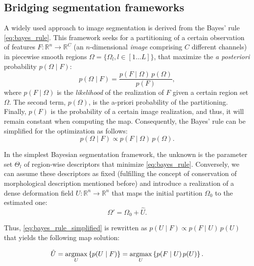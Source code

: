 \subsection{Bridging segmentation frameworks}
\label{sec:methods_map}
%
A widely used approach to image segmentation is derived from the
Bayes' rule \eqref{eq:bayes_rule}. This framework seeks for a 
partitioning of a certain observation of features $F: \mathbb{R}^n \to %
\mathbb{R}^C$ (an $n$-dimensional \emph{image} comprising $C$ different 
channels) in piecewise smooth regions $\Omega = \lbrace \Omega_l , 
l\in\left[ 1 \ldots L \right] \rbrace$,  that maximize the \emph{a posteriori}
probability $p(\Omega \mid F)$:
\begin{equation}
p(\Omega \mid F) = \frac{p(F \mid \Omega)\, p(\Omega)}{p(F)},
\label{eq:bayes_rule}
\end{equation}
where $p(F \mid \Omega)$ is the \emph{likelihood} of the realization 
of $F$ given a certain region set $\Omega$. The second term, $p(\Omega)$,
is the a-priori probability of the partitioning. Finally, $p(F)$ is the 
probability of a certain image realization, and thus, it will remain 
constant when computing the \gls{map}. Consequently, the Bayes' rule
can be simplified for the optimization as follows:
\begin{equation}
p(\Omega \mid F) \propto p(F \mid \Omega)\, p(\Omega).
\label{eq:bayes_rule_simplified}
\end{equation}

In the simplest Bayesian segmentation framework, the unknown is the
parameter set $\Theta_l$ of region-wise descriptors that minimize 
\eqref{eq:bayes_rule}. Conversely, we can assume these descriptors as
fixed (fulfilling the concept of conservation of morphological description
mentioned before) and introduce a realization of a dense deformation field $U: %
\mathbb{R}^n \to \mathbb{R}^n$ that maps the initial partition $\Omega_0$
to the estimated one:
\begin{equation}
\Omega' = \Omega_0 + \hat{U}.
\label{eq:omega_tf}
\end{equation}

Thus, \eqref{eq:bayes_rule_simplified} is rewritten as 
$p(U \mid F) \propto p(F \mid U)\, p(U)$ that yields the
following \gls{map} solution:

\begin{equation}
\hat{U} = \underset{U}{\argmax} \left\{ p(U \mid F) \right\} = 
\underset{U}{\argmax} \left\{ p(F \mid U)\, p(U) \right\}.
\label{eq:map_u}
\end{equation}


